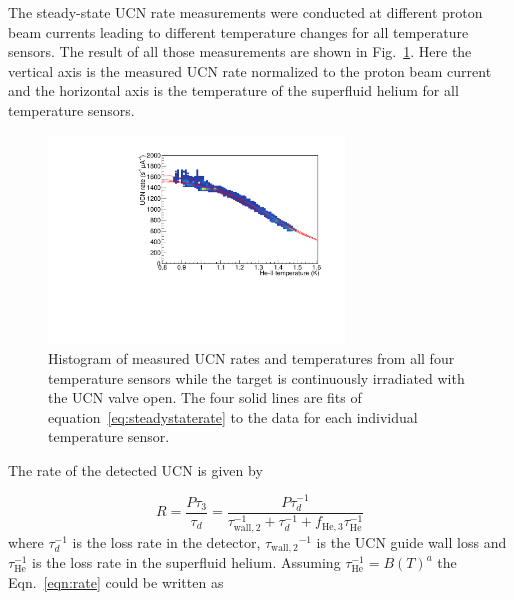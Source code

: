 The steady-state UCN rate measurements were conducted at different
proton beam currents leading to different temperature changes for all
temperature sensors. The result of all those measurements are shown in
Fig.~\ref{fig:rate_vs_temp}. Here the vertical axis is the measured
UCN rate normalized to the proton beam current and the horizontal axis
is the temperature of the superfluid helium for all temperature
sensors.


\begin{figure}[h!]
  \centering
  \includegraphics[width=0.7\textwidth]{rate_vs_temp.pdf}
  \caption{Histogram of measured UCN rates and temperatures from all
    four temperature sensors while the target is continuously
    irradiated with the UCN valve open. The four solid lines are fits
    of equation~\ref{eq:steadystaterate} to the data for each individual temperature
    sensor.}
  \label{fig:rate_vs_temp}
\end{figure}


The rate of the detected UCN is given by

\begin{equation}
  \label{eqn:rate}
  R = \frac{P \tau_3}{\tau_d} = \frac{P \tau_d^{-1}}{\tau_\mathrm{wall,2}^{-1} + \tau_d^{-1} + f_\mathrm{He,3}\tau_\mathrm{He}^{-1}}
\end{equation}
where $\tau_d^{-1}$ is the loss rate in the detector,
${\tau_\mathrm{wall,2}}^{-1}$ is the UCN guide wall loss and
$\tau_\mathrm{He}^{-1}$ is the loss rate in the superfluid helium.
Assuming $\tau_\mathrm{He}^{-1} = B \left( T \right)^a$ the
Eqn.~\ref{eqn:rate} could be written as

